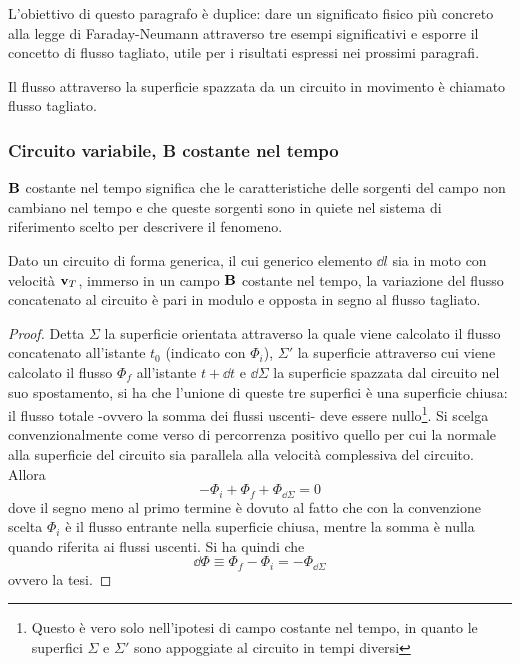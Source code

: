 L'obiettivo di questo paragrafo è duplice: dare un significato fisico più
concreto alla legge di Faraday-Neumann attraverso tre esempi significativi
e esporre il concetto di flusso tagliato, utile per i risultati
espressi nei prossimi paragrafi.

\begin{defn}
    Il flusso attraverso la superficie spazzata da un circuito in movimento è chiamato flusso tagliato.
\end{defn}


\subsubsection{Circuito variabile, B costante nel tempo}
$\vb{B}$ costante nel tempo significa che le caratteristiche delle sorgenti del campo non cambiano nel tempo
e che queste sorgenti sono in quiete nel sistema di riferimento scelto per descrivere il fenomeno.
\begin{thm}
    Dato un circuito di forma generica, il cui generico elemento $\dd{l}$ sia in moto con velocità $\vb{v}_T$,
    immerso in un campo $\vb{B}$ costante nel tempo, la variazione del flusso concatenato al circuito è
    pari in modulo e opposta in segno al flusso tagliato.
\end{thm}
\begin{proof}
    Detta $\Sigma$ la superficie orientata attraverso la quale viene calcolato il flusso concatenato all'istante $t_0$
    (indicato con $\Phi_i$), $\Sigma'$ la superficie attraverso cui viene calcolato il flusso $\Phi_f$ all'istante
    $t+\dd{t}$ e $\dd{\Sigma}$ la superficie spazzata dal circuito nel suo spostamento, si ha che l'unione di queste tre superfici
    è una superficie chiusa: il flusso totale -ovvero la somma dei flussi uscenti- deve essere nullo\footnote{Questo è vero solo
    nell'ipotesi di campo costante nel tempo, in quanto le superfici $\Sigma$ e $\Sigma'$ sono appoggiate al circuito
    in tempi diversi}. Si scelga convenzionalmente come verso di percorrenza positivo quello per cui la normale alla superficie del
    circuito sia parallela alla velocità complessiva del circuito. Allora
    \[
        -\Phi_i+\Phi_f+\Phi_{\dd{\Sigma}}=0
    \]
    dove il segno meno al primo termine è dovuto al fatto che con la convenzione scelta $\Phi_i$ è
    il flusso entrante nella superficie chiusa, mentre la somma è nulla quando riferita ai flussi uscenti.
    Si ha quindi che
    \[
        \dd{\Phi} \equiv \Phi_f-\Phi_i=-\Phi_{\dd{\Sigma}}
    \]
    ovvero la tesi.
\end{proof}
